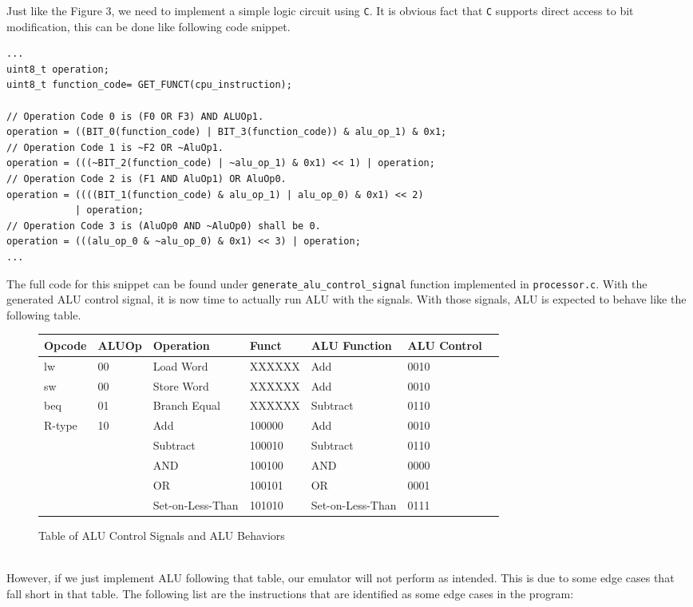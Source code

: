 \documentclass{homework}
\begin{document}
Just like the Figure 3, we need to implement a simple logic circuit using \texttt{C}. It is obvious fact that \texttt{C} supports direct access to bit modification, this can be done like following code snippet.
\\
\begin{center}
\begin{code}
\begin{verbatim}
...
uint8_t operation;
uint8_t function_code= GET_FUNCT(cpu_instruction);

// Operation Code 0 is (F0 OR F3) AND ALUOp1.
operation = ((BIT_0(function_code) | BIT_3(function_code)) & alu_op_1) & 0x1;
// Operation Code 1 is ~F2 OR ~AluOp1.
operation = (((~BIT_2(function_code) | ~alu_op_1) & 0x1) << 1) | operation;
// Operation Code 2 is (F1 AND AluOp1) OR AluOp0.
operation = ((((BIT_1(function_code) & alu_op_1) | alu_op_0) & 0x1) << 2) 
            | operation;
// Operation Code 3 is (AluOp0 AND ~AluOp0) shall be 0.
operation = (((alu_op_0 & ~alu_op_0) & 0x1) << 3) | operation;
...
\end{verbatim}
\end{code}
\end{center}
The full code for this snippet can be found under \texttt{generate_alu_control_signal} function implemented in \texttt{processor.c}. With the generated ALU control signal, it is now time to actually run ALU with the signals. With those signals, ALU is expected to behave like the following table.
\\
\begin{figure}[h]
\begin{center}
\begin{tabular}{|l|l|l|l|l|l|l}
    \hline
    \textbf{Opcode} & \textbf{ALUOp} & \textbf{Operation} & \textbf{Funct} & \textbf{ALU Function} & \textbf{ALU Control} \\
    \hline
        lw & 00 & Load Word & XXXXXX & Add & 0010 \\
        sw & 00 & Store Word & XXXXXX & Add & 0010 \\
        beq & 01 & Branch Equal & XXXXXX & Subtract & 0110 \\
        R-type & 10 & Add & 100000 & Add & 0010 \\
         & & Subtract & 100010 & Subtract & 0110 \\
         & & AND & 100100 & AND & 0000 \\
         & & OR & 100101 & OR & 0001 \\
         & & Set-on-Less-Than & 101010 & Set-on-Less-Than & 0111 \\
    \hline
\end{tabular}
\caption{Table of ALU Control Signals and ALU Behaviors}
\end{center}
\end{figure}
\\
However, if we just implement ALU following that table, our emulator will not perform as intended. This is due to some edge cases that fall short in that table. The following list are the instructions that are identified as some edge cases in the program:
\end{document}
